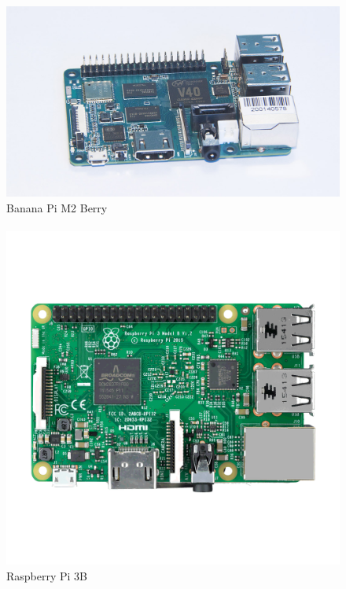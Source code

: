 \begin{figure}[H]
	\centering
	\includegraphics[scale=.8]{Capitulo2/images/bananaPi.jpg}
	\caption{Banana Pi M2 Berry}
	\label{fig:}
\end{figure}

\paragraph{}
\begin{figure}[H]
	\centering
	\includegraphics[scale=.23]{Capitulo2/images/raspberry.png}
	\caption{Raspberry Pi 3B}
	\label{fig:}
\end{figure}


